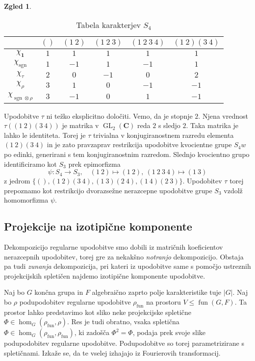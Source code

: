 \documentclass[11pt]{book}
\def\CC{\mathbf{C}}
\def\11{\mathbf{1}}
\DeclareMathOperator\sgn{sgn}
\DeclareMathOperator\fun{fun}
\DeclareMathOperator\GL{GL}
\theoremstyle{definition}
\theoremstyle{zgled}
\newtheorem*{zgled}{Zgled}
\theoremstyle{odprtproblem}
\theoremstyle{domacanaloga}
\theoremstyle{izrek}
\begin{document}
\begin{zgled}
\begin{table}[t]
    \centering
\begin{tabular}{c|ccccc}
    & $()$ & $(1 \ 2)$ & $(1 \ 2 \ 3)$ &  $(1 \ 2 \ 3 \ 4)$ &  $(1 \ 2)(3 \ 4)$\\ \hline
    $\chi_{\11}$ & $1$ & $1$ & $1$ & $1$ & $1$ \\
    $\chi_{\sgn}$ & $1$ & $-1$ & $1$ & $-1$ & $1$ \\
    $\chi_{\tau}$ & $2$ & $0$ & $-1$ & $0$ & $2$  \\
    $\chi_{\rho}$ & $3$ & $1$ & $0$ & $-1$ & $-1$  \\
    $\chi_{\sgn \otimes \rho}$ & $3$ & $-1$ & $0$ & $1$ & $-1$  \\
\end{tabular}
\caption{Tabela karakterjev $S_4$}
\end{table}

Upodobitve $\tau$ ni težko eksplicitno določiti. Vemo, da je stopnje $2$. Njena vrednost $\tau((1 \ 2)(3 \ 4))$ je matrika v $\GL_2(\CC)$ reda $2$ s sledjo $2$. Taka matrika je lahko le identiteta. Torej je $\tau$ trivialna v konjugiranostnem razredu elementa $(1 \ 2)(3 \ 4)$ in je zato pravzaprav restrikcija upodobitve kvocientne grupe $S_4w$ po edinki, generirani s tem konjugiranostnim razredom. Slednjo kvocientno grupo identificiramo kot $S_3$ prek epimorfizma
\[
    \psi \colon S_4 \to S_3, \quad
    (1 \ 2) \mapsto (1 \ 2), \
    (1 \ 2 \ 3 \ 4) \mapsto (1 \ 3)
\]
z jedrom $\{ (), (1 \ 2)(3 \ 4), (1 \ 3)(2 \ 4), (1 \ 4)(2 \ 3) \}$. Upodobitev $\tau$ torej prepoznamo kot restrikcijo dvorazsežne nerazcepne upodobitve grupe $S_3$ vzdolž homomorfizma $\psi$.
\end{zgled}


\subsection{Projekcije na izotipične komponente}

Dekompozicijo regularne upodobitve smo dobili iz matričnih koeficientov nerazcepnih upodobitev, torej gre za nekakšno \emph{notranjo} dekompozicijo. Obstaja pa tudi \emph{zunanja} dekompozicija, pri kateri iz upodobitve same s pomočjo ustreznih projekcijskih spletičen najdemo izotipične komponente upodobitve.

Naj bo $G$ končna grupa in $F$ algebraično zaprto polje karakteristike tuje $|G|$. Naj bo $\rho$ podupodobitev regularne upodobitve $\rho_{\fun}$ na prostoru $V \leq \fun(G,F)$. Ta prostor lahko predstavimo kot sliko neke projekcijske spletične $\Phi \in \hom_G(\rho_{\fun}, \rho)$. Res je tudi obratno, vsaka spletična $\Phi \in \hom_G(\rho_{\fun}, \rho_{\fun})$, ki zadošča $\Phi^2 = \Phi$, podaja prek svoje slike podupodobitev regularne upodobitve. Podupodobitve so torej parametrizirane s spletičnami. Izkaže se, da te vselej izhajajo iz Fourierovih transformacij.
\end{document}
